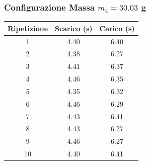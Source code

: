 \documentclass[a4paper,12pt]{article}
\begin{document}
\subsubsection*{Configurazione Massa $m_4 = 30.03$ g}
\noindent
\begin{minipage}[c]{0.45\textwidth}
\centering
\small
\begin{tabular}{ccc}
\hline
\textbf{Ripetizione} & \textbf{Scarico (s)} & \textbf{Carico (s)} \\ \hline
1  & 4.40 & 6.40 \\
2  & 4.38 & 6.27 \\
3  & 4.41 & 6.37 \\
4  & 4.46 & 6.35 \\
5  & 4.35 & 6.32 \\
6  & 4.46 & 6.29 \\
7  & 4.43 & 6.41 \\
8  & 4.43 & 6.27 \\
9  & 4.46 & 6.27 \\
10 & 4.40 & 6.41 \\ \hline
\end{tabular}
\label{tab:dinamica_massa4}
\end{minipage}
\hfill
\begin{minipage}[c]{0.50\textwidth}
\centering
{}
\label{fig:isto_massa4}
\end{minipage}

\vspace{0.8cm}

\end{document}
